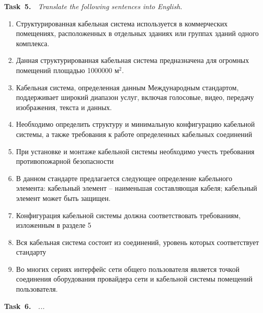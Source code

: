 {\bf Task~5.}~~{\it Translate the following sentences into English.}\par
\begin{enumerate}
    \item {Структурированная кабельная система используется в коммерческих помещениях,
    расположенных в отдельных зданиях или группах зданий одного комплекса.}
    \item {Данная структурированная кабельная система предназначена для огромных помещений площадью 1000000 м$^2$.}
    \item {Кабельная система, определенная данным Международным стандартом, поддерживает
    широкий диапазон услуг, включая голосовые, видео, передачу изображения, текста и данных.}
    \item {Необходимо определить структуру и минимальную конфигурацию кабельной системы, а
    также требования к работе определенных кабельных соединений}
    \item {При установке и монтаже кабельной системы необходимо учесть требования 
    противопожарной безопасности}
    \item {В данном стандарте предлагается следующее определение кабельного элемента:
    кабельный элемент -- наименьшая составляющая кабеля; кабельный элемент может быть защищен.}
    \item {Конфигурация кабельной системы должна соответствовать требованиям, изложенным в
    разделе 5}
    \item {Вся кабельная система состоит из соединений, уровень которых соответствует стандарту}
    \item {Во многих сериях интерфейс сети общего пользователя является точкой соединения
    оборудования провайдера сети и кабельной системы помещений пользователя.}
\end{enumerate}

{\bf Task~6.}~~{\it ...}\par














